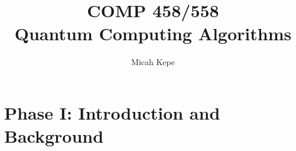 \documentclass{report}
\title{\Huge{COMP 458/558}\\Quantum Computing Algorithms}
\author{\huge{Micah Kepe}}
\date{}
\begin{document}
\maketitle
\newpage  %
\tableofcontents
\pagebreak

\chapter{Phase I: Introduction and Background}















% 




\end{document}
